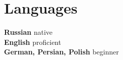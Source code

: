 \documentclass[11pt]{article} %
\begin{document}
\section*{Languages}

\textbf{Russian} native\\
\textbf{English} proficient\\
\textbf{German, Persian, Polish} beginner




\end{document}
